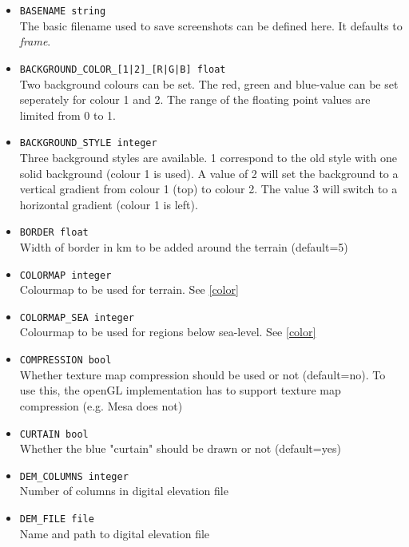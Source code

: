 \begin{itemize}
\item \texttt{BASENAME string}\\
The basic filename used to save screenshots can be defined here. It defaults to \emph{frame}.

\item \texttt{BACKGROUND\_COLOR\_[1|2]\_[R|G|B] float} \\
Two background colours can be set. The red, green and blue-value can be set seperately for colour 1 and 2.
The range of the floating point values are limited from 0 to 1.

\item \texttt{BACKGROUND\_STYLE integer} \\
Three background styles are available. 1 correspond to the old style with one solid background (colour 1 is used). A value of 2
will set the background to a vertical gradient from colour 1 (top) to colour 2. The value 3 will switch to a horizontal gradient
(colour 1 is left).

\item \texttt{BORDER float} \\
Width of border in km to be added around the terrain (default=5)

\item \texttt{COLORMAP integer} \\
Colourmap to be used for terrain. See \ref{color}

\item \texttt{COLORMAP\_SEA integer} \\
Colourmap to be used for regions below sea-level. See \ref{color}

\item \texttt{COMPRESSION bool} \\
Whether texture map compression should be used or not (default=no). To use this, the openGL implementation has to support texture map compression (e.g. Mesa does not)

\item \texttt{CURTAIN bool} \\
Whether the blue "curtain" should be drawn or not (default=yes)

\item \texttt{DEM\_COLUMNS integer} \\
Number of columns in digital elevation file

\item \texttt{DEM\_FILE file} \\
Name and path to digital elevation file


\end{itemize}
